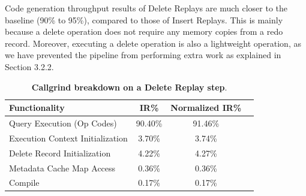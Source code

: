 \documentclass[12pt]{cmuthesis}
\begin{document}
Code generation throughput results of Delete Replays are much closer to the baseline (90\% to 95\%), compared to those of Insert Replays. This is mainly because a delete operation does not require any memory copies from a redo record. Moreover, executing a delete operation is also a lightweight operation, as we have prevented the pipeline from performing extra work as explained in Section 3.2.2.

\begin{table}[H]
\begin{center}
\begin{tabular}{ l c c l } 
 \toprule
\textbf{Functionality} & \textbf{IR\%} & \textbf{Normalized IR\%}\\ 
 \toprule
Query Execution (Op Codes) & 90.40\% & 91.46\%\\
 \midrule
 Execution Context Initialization & 3.70\% & 3.74\% \\ 
 \midrule
 Delete Record Initialization &4.22\% & 4.27\% \\
 \midrule
 Metadata Cache Map Access & 0.36\% & 0.36\% \\
 \midrule
 Compile & 0.17\% & 0.17\% \\
 \bottomrule
\end{tabular}

\caption{\textbf{Callgrind breakdown on a Delete Replay step}.}
\label{tab:throughput_exp_delete_overhead_all}
\end{center}
\end{table}

\begin{table}[H]
\begin{center}
\caption{\textbf{Callgrind breakdown on the Query Execution step of a Delete Replay step}.}
\label{tab:throughput_exp_delete_overhead_all}
\end{center}
\end{table}
\end{document}
